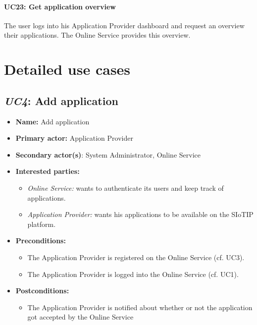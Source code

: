\paragraph{UC23: Get application overview}
The user logs into his Application Provider dashboard and request an overview their applications. The Online Service provides this overview.


\section{Detailed use cases}

\subsection{\emph{UC4}: Add application}
\begin{itemize}
    \item \textbf{Name:} Add application
    \item \textbf{Primary actor:} Application Provider
    \item \textbf{Secondary actor(s)}: System Administrator, Online Service
    \item \textbf{Interested parties:} 
        \begin{itemize}
            \item \textit{Online Service:} wants to authenticate its users and keep track of applications.
            \item \textit{Application Provider:} wants his applications to be available on the SIoTIP platform.
        \end{itemize}

    \item \textbf{Preconditions:}
        \begin{itemize}
            \item The Application Provider is registered on the Online Service (cf. UC3).
            \item The Application Provider is logged into the Online Service (cf. UC1).
        \end{itemize}

    \item \textbf{Postconditions:}
        \begin{itemize}
            \item The Application Provider is notified about whether or not the application got accepted by the Online Service
        \end{itemize}
        

\end{itemize}
